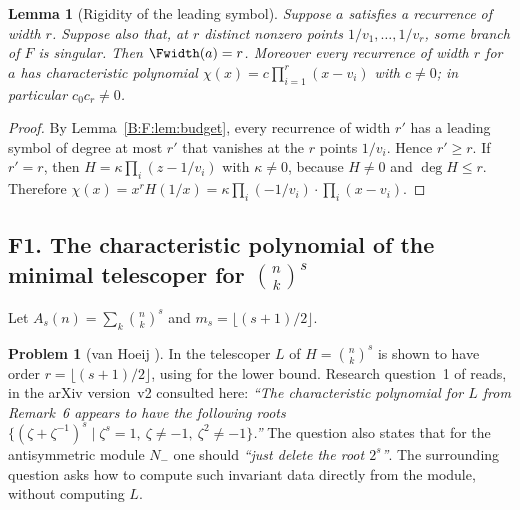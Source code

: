 \documentclass[11pt,a4paper]{article}
\newtheorem{lemma}[theorem]{Lemma}
\theoremstyle{definition}
\newtheorem{problem}[theorem]{Problem}
\theoremstyle{remark}
\numberwithin{equation}{section}
\begin{document}
\begin{lemma}[Rigidity of the leading symbol]\label{B:F:lem:rigid}
Suppose $a$ satisfies a recurrence of width $r$. Suppose also that, at $r$
distinct nonzero points $1/v_1,\dots,1/v_r$, some branch of $F$ is singular.
Then $\Fwidth(a)=r$. Moreover every recurrence of width $r$ for $a$ has
characteristic polynomial $\chi(x)=c\prod_{i=1}^r(x-v_i)$ with $c\ne0$; in
particular $c_0c_r\ne0$.
\end{lemma}

\begin{proof}
By Lemma~\ref{B:F:lem:budget}, every recurrence of width $r'$ has a leading
symbol of degree at most $r'$ that vanishes at the $r$ points $1/v_i$. Hence
$r'\ge r$. If $r'=r$, then $H=\kappa\prod_i(z-1/v_i)$ with $\kappa\ne0$,
because $H\ne0$ and $\deg H\le r$. Therefore
$\chi(x)=x^rH(1/x)=\kappa\prod_i(-1/v_i)\cdot\prod_i(x-v_i)$.
\end{proof}

\subsection{F1. The characteristic polynomial of the minimal telescoper for \texorpdfstring{$\binom nk^s$}{binomial(n,k)\textasciicircum s}}\label{B:F:ssec:vh}

Let $A_s(n)=\sum_k\binom nk^s$ and $m_s=\lfloor(s+1)/2\rfloor$.

\begin{problem}[van Hoeij {\cite[\S7, Question 1; Remark 6]{R055}}]\label{B:F:prob:vh}
In \cite[Remark~6]{R055} the telescoper $L$ of $H=\binom nk^s$ is shown to
have order $r=\lfloor(s+1)/2\rfloor$, using \cite[Theorem~1.1]{R002} for the
lower bound. Research question~1 of \cite[\S7]{R055} reads, in the arXiv
version~v2 consulted here: \emph{``The characteristic polynomial for $L$
from Remark~6 appears to have the following roots
$\{(\zeta+\zeta^{-1})^s\mid\zeta^s=1,\ \zeta\ne-1,\ \zeta^2\ne-1\}$.''} The
question also states that for the antisymmetric module $N_-$ one should
\emph{``just delete the root $2^s$''}. The surrounding question asks how to
compute such invariant data directly from the module, without computing $L$.
\end{problem}
\end{document}
